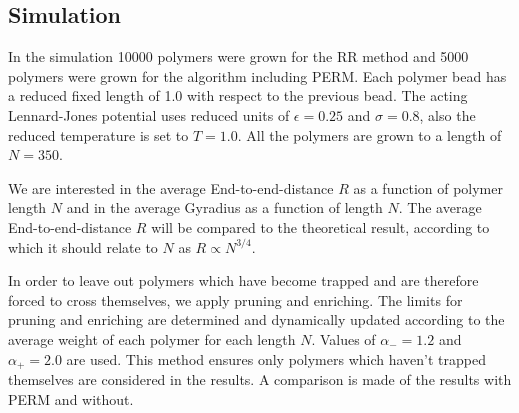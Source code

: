 \subsection*{Simulation}
In the simulation 10000 polymers were grown for the RR method and 5000 polymers were grown for the algorithm including PERM. Each polymer bead has a reduced fixed length of 1.0 with respect to the previous bead. The acting Lennard-Jones potential uses reduced units of $\epsilon=0.25$ and $\sigma=0.8$, also the reduced temperature is set to $T=1.0$. All the polymers are grown to a length of $N=350$. 

We are interested in the average End-to-end-distance $R$ as a function of polymer length $N$ and in the average Gyradius as a function of length $N$. The average End-to-end-distance $R$ will be compared to the theoretical result, according to which it should relate to $N$ as $R\propto N^{3/4}$.

In order to leave out polymers which have become trapped and are therefore forced to cross themselves, we apply pruning and enriching. The limits for pruning and enriching are determined and dynamically updated according to the average weight of each polymer for each length $N$. Values of $\alpha_-=1.2$ and $\alpha_+=2.0$ are used. This method ensures only polymers which haven't trapped themselves are considered in the results. A comparison is made of the results with PERM and without.